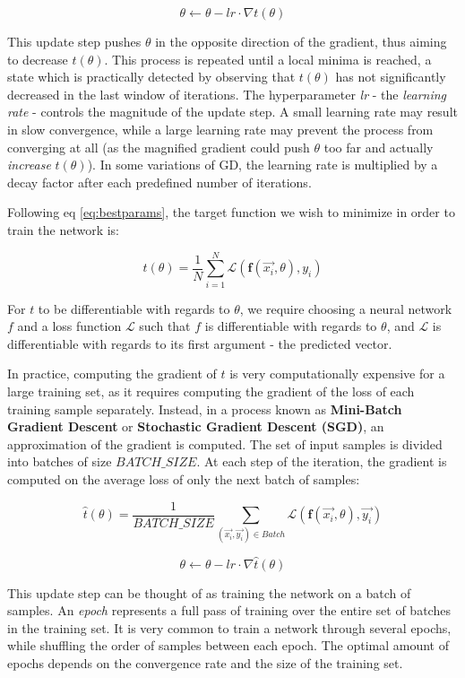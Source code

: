 $$ \theta \leftarrow \theta - \textit{lr} \cdot \nabla t(\theta) $$

This update step pushes $\theta$ in the opposite direction of the gradient, thus aiming to decrease $t(\theta)$. This process is repeated until a local minima is reached, a state which is practically detected by observing that $t(\theta)$ has not significantly decreased in the last window of iterations. The hyperparameter \textit{lr} - the \textit{learning rate} - controls the magnitude of the update step. A small learning rate may result in slow convergence, while a large learning rate may prevent the process from converging at all (as the magnified gradient could push $\theta$ too far and actually \emph{increase} $t(\theta)$). In some variations of GD, the learning rate is multiplied by a decay factor after each predefined number of iterations. 

Following eq \ref{eq:bestparams}, the target function we wish to minimize in order to train the network is:

$$ t(\theta) = \frac{1}{N}\sum_{i=1}^N \mathcal{L}(\textbf{f}(\vec{x_i}, \theta), y_i) $$

For $t$ to be differentiable with regards to $\theta$, we require choosing a neural network $f$ and a loss function $\mathcal{L}$ such that $f$ is differentiable with regards to $\theta$, and $\mathcal{L}$ is differentiable with regards to its first argument - the predicted vector.

In practice, computing the gradient of $t$ is very computationally expensive for a large training set, as it requires computing the gradient of the loss of each training sample separately. Instead, in a process known as \textbf{Mini-Batch Gradient Descent} or \textbf{Stochastic Gradient Descent (SGD)}, an approximation of the gradient is computed. The set of input samples is divided into batches of size $BATCH\_SIZE$. At each step of the iteration, the gradient is computed on the average loss of only the next batch of samples:

$$ \hat{t}(\theta) = \frac{1}{BATCH\_SIZE}\sum_{(\vec{x_i}, \vec{y_i}) \in Batch} \mathcal{L}(\textbf{f}(\vec{x_i}, \theta), \vec{y_i})  $$

$$ \theta \leftarrow \theta - \textit{lr} \cdot \nabla \hat{t}(\theta) $$

This update step can be thought of as training the network on a batch of samples. An \emph{epoch} represents a full pass of training over the entire set of batches in the training set. It is very common to train a network through several epochs, while shuffling the order of samples between each epoch. The optimal amount of epochs depends on the convergence rate and the size of the training set.

